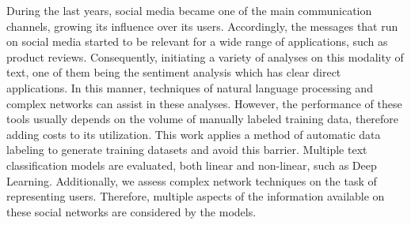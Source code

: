 \begin{foreignabstract}

During the last years, social media became one of the main communication channels, growing its influence over its users.
Accordingly, the messages that run on social media started to be relevant for a wide range of applications, such as product reviews.
Consequently, initiating a variety of analyses on this modality of text, one of them being the sentiment analysis which has clear direct applications.
In this manner, techniques of natural language processing and complex networks can assist in these analyses.
However, the performance of these tools usually depends on the volume of manually labeled training data, therefore adding costs to its utilization.
This work applies a method of automatic data labeling to generate training datasets and avoid this barrier.
Multiple text classification models are evaluated, both linear and non-linear, such as Deep Learning.
Additionally, we assess complex network techniques on the task of representing users.
Therefore, multiple aspects of the information available on these social networks are considered by the models.

\end{foreignabstract}


